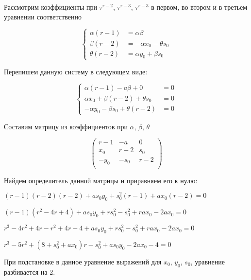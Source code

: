 Рассмотрим коэффициенты при $ \tau^{r-2} $, $ \tau^{r-3} $, $ \tau^{r-3} $ в первом, во втором и в третьем уравнении соответственно

\begin{equation*}
\label{eq:step2_coeff}
	\left\{
		\begin{aligned}
			\alpha (r-1) &= \alpha \beta \\
			\beta  (r-2) &= -\alpha x_0 - \theta s_0 \\
			\theta (r-2) &= \alpha y_0 + \beta s_0
		\end{aligned}
	\right.
\end{equation*}

\newpage

Перепишем данную систему в следующем виде:

\begin{equation*}
\label{eq:step2_coeff_determinant}
	\left\{
		\begin{aligned}
			\alpha (r-1) - a \beta + 0 &= 0 \\
			\alpha x_0 + \beta (r-2) + \theta s_0 &= 0 \\
			-\alpha y_0	- \beta s_0 + \theta (r-2) &= 0 
		\end{aligned}
	\right.
\end{equation*}

Составим матрицу из коэффициентов при $ \alpha $, $ \beta $, $ \theta $ 

\begin{equation}
\label{eq:determinant}
	\left(
		\begin{array}{ccc}
			r-1 & -a & 0 \\
			x_0 & r-2 & s_0 \\
			-y_0 & -s_0 & r-2 \\
		\end{array}
	\right)
\end{equation}

Найдем определитель данной матрицы и приравняем его к нулю:

$ (r-1)(r-2)(r-2) + as_0y_0 + s^2_0(r-1) + ax_0(r-2) = 0 $

$ (r-1)(r^2-4r+4) + as_0y_0 + rs^2_0 - s^2_0 + rax_0 - 2ax_0 = 0 $

$ r^3 - 4r^2 + 4r - r^2 + 4r - 4 + as_0y_0 + rs^2_0 - s^2_0 + rax_0 - 2ax_0 = 0 $

$ r^3 - 5r^2 + (8 + s^2_0 + ax_0)r - s^2_0 + as_0y_0 - 2ax_0 - 4 = 0 $

При подстановке в данное уравнение выражений для $ x_0 $, $ y_0 $, $ s_0 $, уравнение разбивается на 2.

